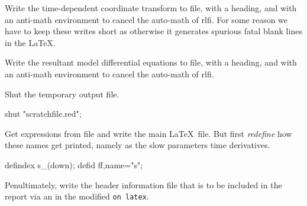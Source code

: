 \documentclass[11pt,a5paper]{article}
\def\ou\big(#1,#2,#3\big)%
\def\eps{\ensuremath{\varepsilon}}
\begin{document}
Write the time-dependent coordinate transform to file, with a
heading, and with an anti-math environment to cancel the
auto-math of rlfi. For some reason we have to keep these
writes short as otherwise it generates spurious fatal
blank lines in the \LaTeX.

Write the resultant model differential equations to file,
with a heading, and with an anti-math environment to cancel
the auto-math of rlfi.

Shut the temporary output file.
\begin{reduce}
shut "scratchfile.red";
\end{reduce}

Get expressions from file and write the main \LaTeX\ file.
But first \emph{redefine} how these names get printed,
namely as the slow parameters time derivatives. 
\begin{reduce}
defindex s_(down);
defid ff,name="\dot s";
\end{reduce}

Penultimately, write the header information file that is 
to be included in the report via an \verb|| in the 
modified \verb|on latex|.
\end{document}
